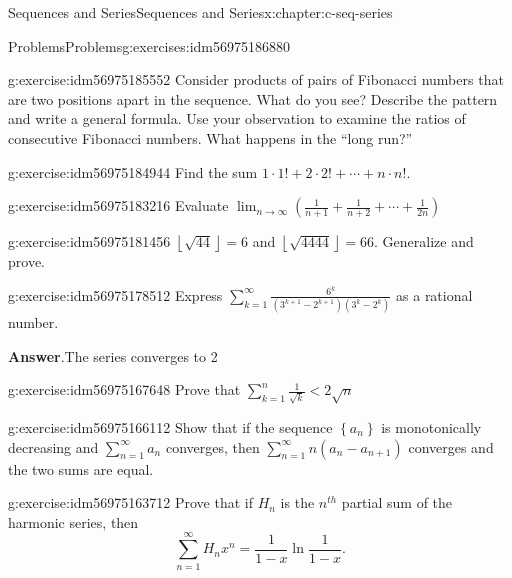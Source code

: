\documentclass[twoside,10pt,]{book}
\newcommand{\blocktitlefont}{\relax}
\numberwithin{equation}{section}
\newcommand{\lt}{<}
\begin{document}
\begin{chapterptx}{Sequences and Series}{}{Sequences and Series}{}{}{x:chapter:c-seq-series}
\begin{exercises-section}{Problems}{}{Problems}{}{}{g:exercises:idm56975186880}
\begin{divisionexercise}{1}{}{}{g:exercise:idm56975185552}
Consider products of pairs of Fibonacci numbers that are two positions apart in the sequence.  What do you see?  Describe the pattern and write a general formula.  Use your observation to examine the ratios of consecutive Fibonacci numbers.   What happens in the  ``long run?''%
\end{divisionexercise}%
\begin{divisionexercise}{2}{}{}{g:exercise:idm56975184944}%
Find the sum  \(1\cdot 1! + 2\cdot 2! + \cdots +n\cdot n!\).%
\end{divisionexercise}%
\begin{divisionexercise}{3}{}{}{g:exercise:idm56975183216}%
Evaluate  \(\lim_{n\to \infty }  \left(\frac{1}{n+1}+ \frac{1}{n+2}+ \cdots +\frac{1}{2n}\right)\)%
\end{divisionexercise}%
\begin{divisionexercise}{4}{}{}{g:exercise:idm56975181456}%
\(\left\lfloor \sqrt{44}\right\rfloor =6\) and   \(\left\lfloor \sqrt{4444}\right\rfloor =66\).  Generalize and prove.%
\end{divisionexercise}%
\begin{divisionexercise}{5}{}{}{g:exercise:idm56975178512}%
Express \(\sum _{k=1}^{\infty } \frac{6^k}{\left(3^{k+1}-2^{k+1}\right) \left(3^k-2^k\right)}\) as a rational number.%
\par\smallskip%
\noindent\textbf{\blocktitlefont Answer}.\hypertarget{g:answer:idm56975168000}{}\quad{}The series converges to 2%
\end{divisionexercise}%
\begin{divisionexercise}{6}{}{}{g:exercise:idm56975167648}%
Prove that \(\sum _{k=1}^n \frac{1}{\sqrt{k}}\lt 2\sqrt{n}\)%
\end{divisionexercise}%
\begin{divisionexercise}{7}{}{}{g:exercise:idm56975166112}%
Show that if the sequence \(\left\{a_n\right\}\) is monotonically decreasing and \(\sum _{n=1}^{\infty } a_n\) converges, then \(\sum _{n=1}^{\infty} n \left(a_n-a_{n+1}\right)\) converges and the two sums are equal.%
\end{divisionexercise}%
\begin{divisionexercise}{8}{}{}{g:exercise:idm56975163712}%
Prove that if \(H_n\) is the \(n^{th}\) partial sum of the harmonic series, then%
\begin{equation*}
\sum_{n=1}^{\infty} H_{n} x^n = \frac{1}{1-x} \ln{\frac{1}{1-x}}\text{.}
\end{equation*}
%
\end{divisionexercise}%

\end{exercises-section}
\end{chapterptx}
\end{document}
